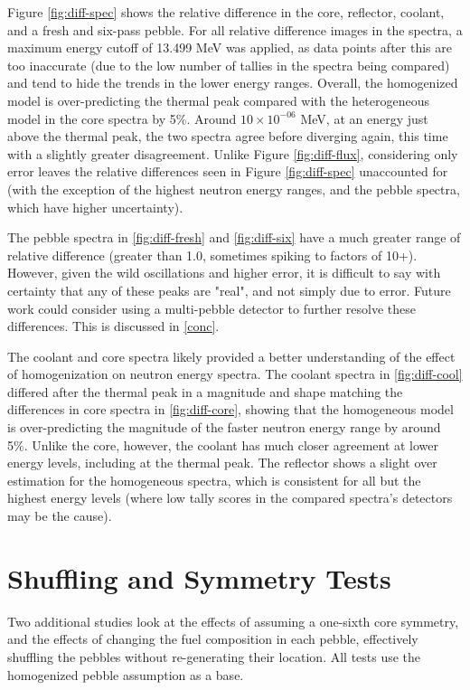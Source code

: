 

Figure \ref{fig:diff-spec} shows the relative difference in the core, reflector, coolant, and a fresh and six-pass pebble. For all relative difference images in the spectra, a maximum energy cutoff of 13.499 MeV was applied, as data points after this are too inaccurate (due to the low number of tallies in the spectra being compared) and tend to hide the trends in the lower energy ranges.  Overall, the homogenized model is over-predicting the thermal peak compared with the heterogeneous model in the core spectra by 5\%.  Around $10\times10^{-06}$ MeV, at an energy just above the thermal peak, the two spectra agree before diverging again, this time with a slightly greater disagreement.  Unlike Figure \ref{fig:diff-flux}, considering only error leaves the relative differences seen in Figure \ref{fig:diff-spec} unaccounted for (with the exception of the highest neutron energy ranges, and the pebble spectra, which have higher uncertainty).

The pebble spectra in \ref{fig:diff-fresh} and \ref{fig:diff-six} have a much greater range of relative difference (greater than 1.0, sometimes spiking to factors of 10+).  However, given the wild oscillations and higher error, it is difficult to say with certainty that any of these peaks are "real", and not simply due to error.  Future work could consider using a multi-pebble detector to further resolve these differences.  This is discussed in \autoref{conc}. 

The coolant and core spectra likely provided a better understanding of the effect of homogenization on neutron energy spectra. The coolant spectra in \ref{fig:diff-cool} differed after the thermal peak in a magnitude and shape matching the differences in core spectra in \ref{fig:diff-core}, showing that the homogeneous model is over-predicting the magnitude of the faster neutron energy range by around 5\%.  Unlike the core, however, the coolant has much closer agreement at lower energy levels, including at the thermal peak.  The reflector shows a slight over estimation for the homogeneous spectra, which is consistent for all but the highest energy levels (where low tally scores in the compared spectra's detectors may be the cause).



\section{Shuffling and Symmetry Tests}
Two additional studies look at the effects of assuming a one-sixth core symmetry, and the effects of changing the fuel composition in each pebble, effectively shuffling the pebbles without re-generating their location.  All tests use the homogenized pebble assumption as a base.

